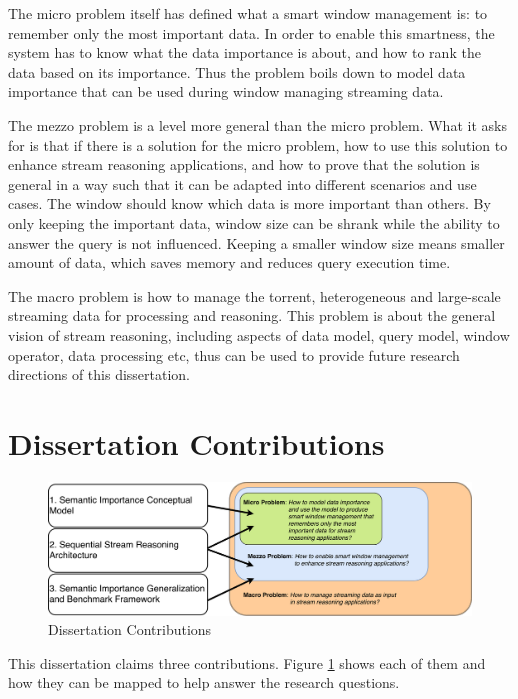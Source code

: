 The micro problem itself has defined what a smart window management is: to remember only the most important data. 
In order to enable this smartness, the system has to know what the data importance is about, and how to rank the data based on its importance. 
Thus the problem boils down to model data importance that can be used during window managing streaming data. 

The mezzo problem is a level more general than the micro problem.
What it asks for is that if there is a solution for the micro problem, how to use this solution to enhance stream reasoning applications, and how to prove that the solution is general in a way such that it can be adapted into different scenarios and use cases. 
The window should know which data is more important than others. 
By only keeping the important data, window size can be shrank while the ability to answer the query is not influenced.
Keeping a smaller window size means smaller amount of data, which saves memory and reduces query execution time. 

The macro problem is how to manage the torrent, heterogeneous and large-scale streaming data for processing and reasoning. 
This problem is about the general vision of stream reasoning, including aspects of data model, query model, window operator, data processing etc, thus can be used to provide future research directions of this dissertation.  
%
\section{Dissertation Contributions}

\begin{figure}[!htbp]
	\centering
    \includegraphics[width=5in]{img/1-dc.pdf}
    \caption{Dissertation Contributions}
    \label{fig:1-dc}
\end{figure}

This dissertation claims three contributions.
Figure \ref{fig:1-dc} shows each of them and how they can be mapped to help answer the research questions.

